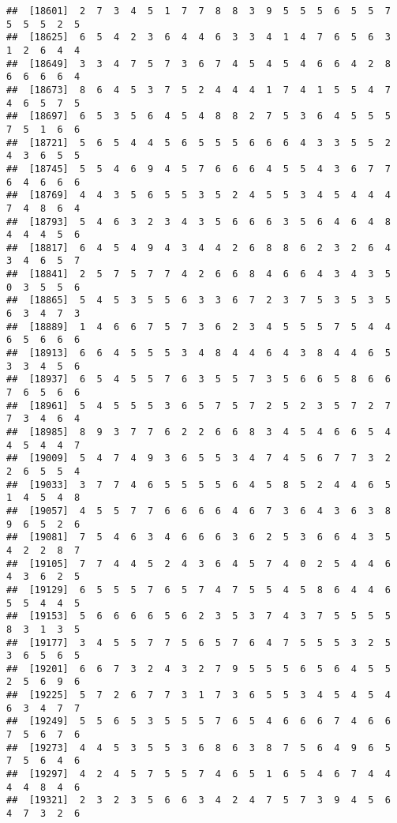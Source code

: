 \documentclass[
]{book}
\begin{document}
\begin{verbatim}
##  [18601]  2  7  3  4  5  1  7  7  8  8  3  9  5  5  5  6  5  5  7  5  5  5  2  5
##  [18625]  6  5  4  2  3  6  4  4  6  3  3  4  1  4  7  6  5  6  3  1  2  6  4  4
##  [18649]  3  3  4  7  5  7  3  6  7  4  5  4  5  4  6  6  4  2  8  6  6  6  6  4
##  [18673]  8  6  4  5  3  7  5  2  4  4  4  1  7  4  1  5  5  4  7  4  6  5  7  5
##  [18697]  6  5  3  5  6  4  5  4  8  8  2  7  5  3  6  4  5  5  5  7  5  1  6  6
##  [18721]  5  6  5  4  4  5  6  5  5  5  6  6  6  4  3  3  5  5  2  4  3  6  5  5
##  [18745]  5  5  4  6  9  4  5  7  6  6  6  4  5  5  4  3  6  7  7  6  4  6  6  6
##  [18769]  4  4  3  5  6  5  5  3  5  2  4  5  5  3  4  5  4  4  4  7  4  8  6  4
##  [18793]  5  4  6  3  2  3  4  3  5  6  6  6  3  5  6  4  6  4  8  4  4  4  5  6
##  [18817]  6  4  5  4  9  4  3  4  4  2  6  8  8  6  2  3  2  6  4  3  4  6  5  7
##  [18841]  2  5  7  5  7  7  4  2  6  6  8  4  6  6  4  3  4  3  5  0  3  5  5  6
##  [18865]  5  4  5  3  5  5  6  3  3  6  7  2  3  7  5  3  5  3  5  6  3  4  7  3
##  [18889]  1  4  6  6  7  5  7  3  6  2  3  4  5  5  5  7  5  4  4  6  5  6  6  6
##  [18913]  6  6  4  5  5  5  3  4  8  4  4  6  4  3  8  4  4  6  5  3  3  4  5  6
##  [18937]  6  5  4  5  5  7  6  3  5  5  7  3  5  6  6  5  8  6  6  7  6  5  6  6
##  [18961]  5  4  5  5  5  3  6  5  7  5  7  2  5  2  3  5  7  2  7  7  3  4  6  4
##  [18985]  8  9  3  7  7  6  2  2  6  6  8  3  4  5  4  6  6  5  4  4  5  4  4  7
##  [19009]  5  4  7  4  9  3  6  5  5  3  4  7  4  5  6  7  7  3  2  2  6  5  5  4
##  [19033]  3  7  7  4  6  5  5  5  5  6  4  5  8  5  2  4  4  6  5  1  4  5  4  8
##  [19057]  4  5  5  7  7  6  6  6  6  4  6  7  3  6  4  3  6  3  8  9  6  5  2  6
##  [19081]  7  5  4  6  3  4  6  6  6  3  6  2  5  3  6  6  4  3  5  4  2  2  8  7
##  [19105]  7  7  4  4  5  2  4  3  6  4  5  7  4  0  2  5  4  4  6  4  3  6  2  5
##  [19129]  6  5  5  5  7  6  5  7  4  7  5  5  4  5  8  6  4  4  6  5  5  4  4  5
##  [19153]  5  6  6  6  6  5  6  2  3  5  3  7  4  3  7  5  5  5  5  8  3  1  3  5
##  [19177]  3  4  5  5  7  7  5  6  5  7  6  4  7  5  5  5  3  2  5  3  6  5  6  5
##  [19201]  6  6  7  3  2  4  3  2  7  9  5  5  5  6  5  6  4  5  5  2  5  6  9  6
##  [19225]  5  7  2  6  7  7  3  1  7  3  6  5  5  3  4  5  4  5  4  6  3  4  7  7
##  [19249]  5  5  6  5  3  5  5  5  7  6  5  4  6  6  6  7  4  6  6  7  5  6  7  6
##  [19273]  4  4  5  3  5  5  3  6  8  6  3  8  7  5  6  4  9  6  5  7  5  6  4  6
##  [19297]  4  2  4  5  7  5  5  7  4  6  5  1  6  5  4  6  7  4  4  4  4  8  4  6
##  [19321]  2  3  2  3  5  6  6  3  4  2  4  7  5  7  3  9  4  5  6  4  7  3  2  6

\end{verbatim}
\end{document}
